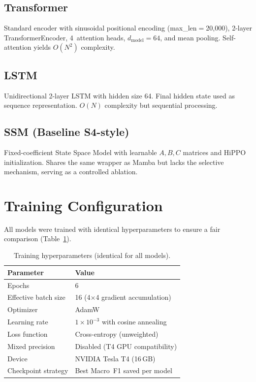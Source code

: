 \documentclass[runningheads]{llncs}
\begin{document}
\subsection{Transformer}
Standard encoder with sinusoidal positional encoding (max\_len$=$20,000),
2-layer TransformerEncoder, 4~attention heads, $d_{\text{model}}{=}64$, and mean
pooling. Self-attention yields $O(N^2)$ complexity.

\subsection{LSTM}
Unidirectional 2-layer LSTM with hidden size 64. Final hidden state used as
sequence representation. $O(N)$ complexity but sequential processing.

\subsection{SSM (Baseline S4-style)}
Fixed-coefficient State Space Model with learnable $A,B,C$ matrices and
HiPPO initialization. Shares the same wrapper as Mamba but lacks the
selective mechanism, serving as a controlled ablation.


\section{Training Configuration}
\label{sec:training}

All models were trained with identical hyperparameters to ensure a fair
comparison (Table~\ref{tab:train_config}).

\begin{table}[ht]
\centering
\caption{Training hyperparameters (identical for all models).}
\label{tab:train_config}
\begin{tabular}{@{} l l @{}}
\toprule
\textbf{Parameter} & \textbf{Value} \\
\midrule
Epochs              & 6 \\
Effective batch size & 16 (4$\times$4 gradient accumulation) \\
Optimizer           & AdamW \\
Learning rate       & $1 \times 10^{-3}$ with cosine annealing \\
Loss function       & Cross-entropy (unweighted) \\
Mixed precision     & Disabled (T4 GPU compatibility) \\
Device              & NVIDIA Tesla T4 (16\,GB) \\
Checkpoint strategy & Best Macro~F1 saved per model \\
\bottomrule
\end{tabular}
\end{table}
\end{document}
